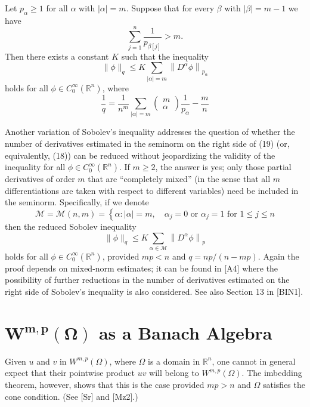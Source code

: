 \begin{theorem}
  Let $p_\alpha \geq 1$ for all $\alpha$ with $|\alpha|=m$. Suppose that for every $\beta$ with $|\beta|=m-1$ we have
  \[
  \sum_{j=1}^n \frac{1}{p_{\beta[j]}}>m .
  \]
  Then there exists a constant $K$ such that the inequality
  \[
  \|\phi\|_q \leq K \sum_{|\alpha|=m}\left\|D^\alpha \phi\right\|_{p_\alpha}
  \]
  holds for all $\phi \in C_0^{\infty}\left(\mathbb{R}^n\right)$, where
  \[
  \frac{1}{q}=\frac{1}{n^m} \sum_{|\alpha|=m}\left(\begin{array}{c}
  m \\
  \alpha
  \end{array}\right) \frac{1}{p_\alpha}-\frac{m}{n}
  \]
\end{theorem}


\begin{para}
  Another variation of Sobolev's inequality addresses the question of whether the number of derivatives estimated in the seminorm on the right side of (19) (or, equivalently, (18)) can be reduced without jeopardizing the validity of the inequality for all $\phi \in C_0^{\infty}\left(\mathbb{R}^n\right)$. If $m \geq 2$, the answer is yes; only those partial derivatives of order $m$ that are ``completely mixed'' (in the sense that all $m$ differentiations are taken with respect to different variables) need be included in the seminorm. Specifically, if we denote
  \[
  \mathcal{M}=\mathcal{M}(n, m)=\left\{\alpha:|\alpha|=m, \quad \alpha_j=0 \text { or } \alpha_j=1 \text { for } 1 \leq j \leq n\right.
  \]
  then the reduced Sobolev inequality
  \[
  \|\phi\|_q \leq K \sum_{\alpha \in \mathcal{M}}\left\|D^\alpha \phi\right\|_p
  \]
  holds for all $\phi \in C_0^{\infty}\left(\mathbb{R}^n\right)$, provided $m p<n$ and $q=n p /(n-m p)$. Again the proof depends on mixed-norm estimates; it can be found in [A4] where the possibility of further reductions in the number of derivatives estimated on the right side of Sobolev's inequality is also considered. See also Section 13 in [BIN1].
\end{para}


\section[$W^{m,p}(\Omega)$ as a Banach Algebra]%
  {$\bm{W^{m, p}(\Omega)}$ as a Banach Algebra}


\begin{para}
  Given $u$ and $v$ in $W^{m,p}(\Omega)$, where $\Omega$ is a domain in $\mathbb{R}^n$, one cannot in general expect that their pointwise product $u v$ will belong to $W^{m,p}(\Omega)$. The imbedding theorem, however, shows that this is the case provided $m p>n$ and $\Omega$ satisfies the cone condition. (See [Sr] and [Mz2].)
\end{para}



